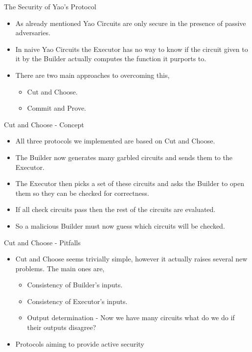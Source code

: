 \documentclass[t, 12pt]{beamer}            %
\begin{document}
\begin{frame}{The Security of Yao's Protocol}
	\begin{itemize} %
		\item As already mentioned Yao Circuits are only secure in the presence of passive adversaries. \footnotemark
		\item In naive Yao Circuits the Executor has no way to know if the circuit given to it by the Builder actually computes the function it purports to.
		\item There are two main approaches to overcoming this,
		\begin{itemize}
			\item Cut and Choose.
			\item Commit and Prove.
		\end{itemize}
	\end{itemize}
	
\end{frame}


\begin{frame}{Cut and Choose - Concept}
	\begin{itemize} %
		\item All three protocols we implemented are based on Cut and Choose.
		\item The Builder now generates many garbled circuits and sends them to the Executor.
		\item The Executor then picks a set of these circuits and asks the Builder to open them so they can be checked for correctness.
		\item If all check circuits pass then the rest of the circuits are evaluated.
		\item So a malicious Builder must now guess which circuits will be checked.
	\end{itemize}

\end{frame}


\begin{frame}{Cut and Choose - Pitfalls}
	\begin{itemize} %
		\item Cut and Choose seems trivially simple, however it actually raises several new problems. The main ones are,
		\begin{itemize}
			\item Consistency of Builder's inputs.
			\item Consistency of Executor's inputs.
			\item Output determination - Now we have many circuits what do we do if their outputs disagree?
		\end{itemize}
		\item Protocols aiming to provide active security 
	\end{itemize}

\end{frame}
\end{document}
